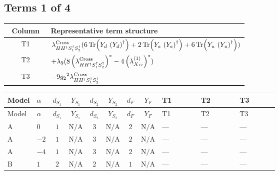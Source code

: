 \documentclass[8pt]{article}
\begin{document}
\begin{landscape}
\subsection*{Terms 1 of 4}
\begin{center}
\begin{tabular}{@{}c >{\raggedright\arraybackslash}p{0.82\linewidth}@{}}
\toprule
Column & Representative term structure \\
\midrule
T1 & \(\displaystyle {\lambda_{H H^\dagger S_1^\dagger S_2^\dagger}^{\rm Cross}} (6 \operatorname{Tr}\!\left({Y_d}\,\left({Y_d}\right)^{\dagger}\right)+2 \operatorname{Tr}\!\left({Y_e}\,\left({Y_e}\right)^{\dagger}\right)+6 \operatorname{Tr}\!\left({Y_u}\,\left({Y_u}\right)^{\dagger}\right))\) \\
\midrule
T2 & \(\displaystyle +{\lambda_{9}} (8 \left({\lambda_{H H^\dagger S_1^\dagger S_2^\dagger}^{\rm Cross}}\right)^{*}-4 \left({\lambda_{X_{17}}^{(1)}}\right)^{*})\) \\
\midrule
T3 & \(\displaystyle -9 {g_2}^2 {\lambda_{H H^\dagger S_1^\dagger S_2^\dagger}^{\rm Cross}}\) \\
\midrule
\bottomrule
\end{tabular}
\end{center}
\smallskip
\tiny
\begin{longtable}{@{}llcccccc >{\raggedright\arraybackslash}p{0.21\linewidth} >{\raggedright\arraybackslash}p{0.21\linewidth} >{\raggedright\arraybackslash}p{0.21\linewidth}@{}}
\toprule
Model & $\alpha$ & $d_{S_1}$ & $Y_{S_1}$ & $d_{S_2}$ & $Y_{S_2}$ & $d_F$ & $Y_F$ & T1 & T2 & T3 \\
\midrule
\endfirsthead
\toprule
Model & $\alpha$ & $d_{S_1}$ & $Y_{S_1}$ & $d_{S_2}$ & $Y_{S_2}$ & $d_F$ & $Y_F$ & T1 & T2 & T3 \\
\midrule
\endhead
A & $0$ & $1$ & $\text{N/A}$ & $3$ & $\text{N/A}$ & $2$ & $\text{N/A}$ & --- & --- & --- \\
\midrule
A & $-2$ & $1$ & $\text{N/A}$ & $3$ & $\text{N/A}$ & $2$ & $\text{N/A}$ & --- & --- & --- \\
\midrule
A & $-4$ & $1$ & $\text{N/A}$ & $3$ & $\text{N/A}$ & $2$ & $\text{N/A}$ & --- & --- & --- \\
\midrule
B & $1$ & $2$ & $\text{N/A}$ & $2$ & $\text{N/A}$ & $1$ & $\text{N/A}$ & --- & --- & --- \\
\midrule

\end{longtable}
\end{landscape}
\end{document}
